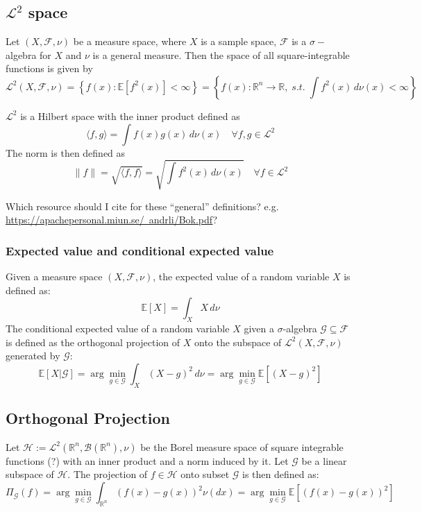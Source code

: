 \subsection{$\mathcal{L^2}$ space}
Let $(X, \mathcal{F}, \nu)$ be a measure space, where $X$ is a sample space, $\mathcal{F}$ is a $\sigma-$algebra for $X$ and $\nu$ is a general measure. Then the space of all square-integrable functions is given by
\[
\mathcal{L}^2(X, \mathcal{F}, \nu) = \left\{ f(x) : \mathbb{E}[f^2(x)] < \infty \right\}
= \left\{ f(x) : \mathbb{R}^{n} \to \mathbb{R}, \; \textit{s.t.} \; \int f^2(x)\, d\nu(x) < \infty \right\}
\]

$\mathcal{L}^2$ is a Hilbert space with the inner product defined as
\[
\langle f, g \rangle = \int f(x) g(x) \, d\nu(x) \quad \forall f, g \in \mathcal{L}^2
\]
The norm is then defined as
\[
\|f\| = \sqrt{\langle f, f \rangle} = \sqrt{\int f^2(x) \, d\nu(x)} \quad \forall f \in \mathcal{L}^2
\]

{\color{blue} Which resource should I cite for these ``general'' definitions? e.g. \href{https://apachepersonal.miun.se/~andrli/Bok.pdf}{https://apachepersonal.miun.se/~andrli/Bok.pdf}?}

\subsubsection*{Expected value and conditional expected value}
Given a measure space $(X, \mathcal{F}, \nu)$, the expected value of a random variable $X$ is defined as:
\[
\mathbb{E}[X] = \int_X X \, d\nu
\]
The conditional expected value of a random variable $X$ given a $\sigma$-algebra $\mathcal{G} \subseteq \mathcal{F}$ is defined as the orthogonal projection of $X$ onto the subspace of $\mathcal{L}^2(X, \mathcal{F}, \nu)$ generated by $\mathcal{G}$:
\[
\mathbb{E}[X | \mathcal{G}] = \arg\min_{g \in \mathcal{G}} \int_X (X - g)^2 \, d\nu
= \arg\min_{g \in \mathcal{G}} \mathbb{E}[(X - g)^2]
\]

\subsection{Orthogonal Projection}
Let $\mathcal{H} := \mathcal{L}^2(\mathbb{R}^n, \mathcal{B}(\mathbb{R}^n),\nu)$ be the Borel measure space of square integrable functions (?) with an inner product and a norm induced by it. Let $\mathcal{G}$ be a linear subspace of $\mathcal{H}$. The projection of $f \in \mathcal{H}$ onto subset $\mathcal{G}$ is then defined as:
\[
\Pi_{\mathcal{G}}(f) = \arg\min_{g \in \mathcal{G}} \int_{\mathbb{R}^n} \left( f(x) - g(x) \right)^2 \nu(dx) = \arg\min_{g \in \mathcal{G}} \mathbb{E}[(f(x) - g(x))^2]
\]
